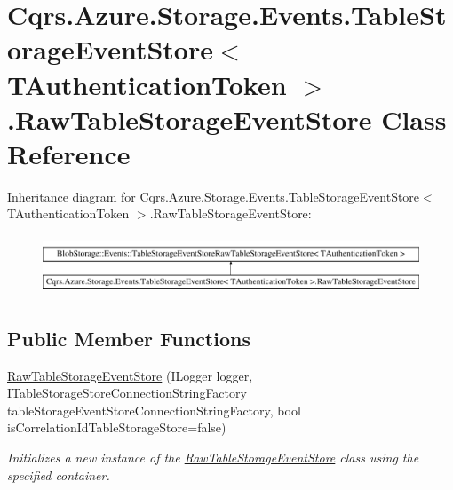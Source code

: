 \hypertarget{classCqrs_1_1Azure_1_1Storage_1_1Events_1_1TableStorageEventStore_1_1RawTableStorageEventStore}{}\section{Cqrs.\+Azure.\+Storage.\+Events.\+Table\+Storage\+Event\+Store$<$ T\+Authentication\+Token $>$.Raw\+Table\+Storage\+Event\+Store Class Reference}
\label{classCqrs_1_1Azure_1_1Storage_1_1Events_1_1TableStorageEventStore_1_1RawTableStorageEventStore}
Inheritance diagram for Cqrs.\+Azure.\+Storage.\+Events.\+Table\+Storage\+Event\+Store$<$ T\+Authentication\+Token $>$.Raw\+Table\+Storage\+Event\+Store\+:\begin{figure}[H]
\begin{center}
\leavevmode
\includegraphics[height=1.792000cm]{classCqrs_1_1Azure_1_1Storage_1_1Events_1_1TableStorageEventStore_1_1RawTableStorageEventStore}
\end{center}
\end{figure}
\subsection*{Public Member Functions}
\begin{DoxyCompactItemize}
\item 
\hyperlink{classCqrs_1_1Azure_1_1Storage_1_1Events_1_1TableStorageEventStore_1_1RawTableStorageEventStore_ad82ce92dd98e683b11b2bdc0b8d5bebc_ad82ce92dd98e683b11b2bdc0b8d5bebc}{Raw\+Table\+Storage\+Event\+Store} (I\+Logger logger, \hyperlink{interfaceCqrs_1_1Azure_1_1BlobStorage_1_1ITableStorageStoreConnectionStringFactory}{I\+Table\+Storage\+Store\+Connection\+String\+Factory} table\+Storage\+Event\+Store\+Connection\+String\+Factory, bool is\+Correlation\+Id\+Table\+Storage\+Store=false)
\begin{DoxyCompactList}\small\item\em Initializes a new instance of the \hyperlink{classCqrs_1_1Azure_1_1Storage_1_1Events_1_1TableStorageEventStore_1_1RawTableStorageEventStore}{Raw\+Table\+Storage\+Event\+Store} class using the specified container. \end{DoxyCompactList}\end{DoxyCompactItemize}
